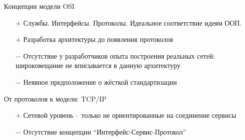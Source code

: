 \documentclass[utf8]{beamer}
\begin{document}
\begin{frame}
\begin{block}{Концепции модели OSI}
\begin{itemize}
	\item[$+$]Службы. Интерфейсы. Протоколы. Идеальное соответствие идеям ООП.
	\item [$+$] Разработка архитектуры до появления протоколов
	\item [$-$] Отсутствие у разработчиков опыта построения реальных сетей: широковещание не вписывается в данную архитектуру
	\item[$-$] Неявное предположение о жёсткой стандартизации
\end{itemize}
\end{block}
\begin{block}{От протоколов к модели: TCP/IP}
\begin{itemize}
	\item[$+$]Сетевой уровень -- только не ориентированные на соединение сервисы
	\item[$-$]Отсутствие концепции ``Интерфейс-Сервис-Протокол''
\end{itemize}
\end{block}
\end{frame}
\end{document}

